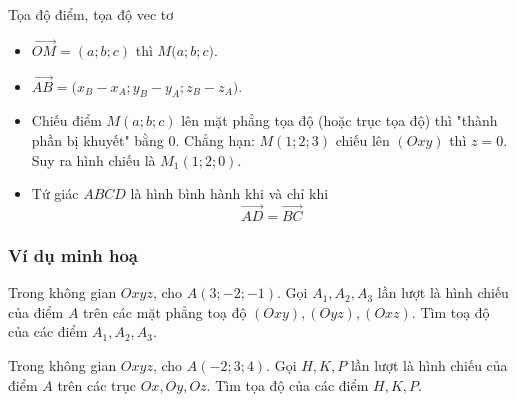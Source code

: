 \begin{dang}{Tọa độ điểm, tọa độ vec tơ}
	\begin{itemize}
		\item $\vec{OM}=(a;b;c)$ thì $M\big(a;b;c\big)$.
		\item $\vec{AB}=\big(x_B-x_A;y_B-y_A;z_B-z_A \big).$
		\item Chiếu điểm $M(a;b;c)$ lên mặt phẳng tọa độ (hoặc trục tọa độ) thì "thành phần bị khuyết" bằng $0$. Chẳng hạn: $M(1;2;3)$ chiếu lên $(Oxy)$ thì $z=0$. Suy ra hình chiếu là $M_1(1;2;0)$.
		\item Tứ giác $ABCD$ là hình bình hành khi và chỉ khi $$\vec{AD}=\vec{BC}$$
	\end{itemize}
\end{dang}
\subsubsection{Ví dụ minh hoạ}
\begin{vd}
	Trong không gian $Oxyz$, cho $A(3 ;-2 ;-1)$. Gọi $ A_1, A_2, A_3$ lần lượt là hình chiếu của điểm $A$ trên các mặt phẳng toạ độ $(Oxy),(Oyz),(Oxz)$. Tìm toạ độ của các điểm $ A_1, A_2, A_3$. 
\end{vd}

\begin{vd}
	Trong không gian $Oxyz$, cho $A(-2;3;4)$. Gọi $H, K, P$ lần lượt là hình chiếu của điểm $A$ trên các trục $Ox, Oy, Oz$. Tìm tọa độ của các điểm $H,K,P$.
\end{vd}

